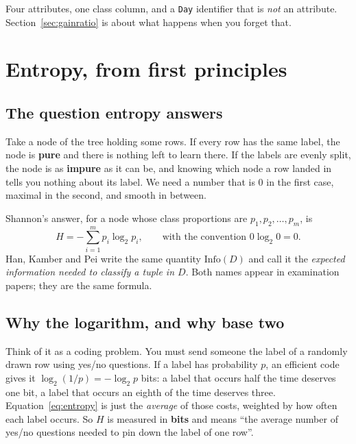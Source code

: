 \documentclass[11pt]{article}
\begin{document}
Four attributes, one class column, and a \texttt{Day} identifier that is
\emph{not} an attribute. Section~\ref{sec:gainratio} is about what happens
when you forget that.

\notesources{\AMLUnitVISources}

\section{Entropy, from first principles}
\label{sec:entropy}

\subsection{The question entropy answers}

Take a node of the tree holding some rows. If every row has the same label,
the node is \textbf{pure} and there is nothing left to learn there. If the
labels are evenly split, the node is as \textbf{impure} as it can be, and
knowing which node a row landed in tells you nothing about its label. We need
a number that is $0$ in the first case, maximal in the second, and smooth in
between.

Shannon's answer, for a node whose class proportions are
$p_1, p_2, \dots, p_m$, is
\begin{equation}
  \label{eq:entropy}
  H = -\sum_{i=1}^{m} p_i \log_2 p_i ,
  \qquad\text{with the convention } 0\log_2 0 = 0 .
\end{equation}
Han, Kamber and Pei write the same quantity $\mathrm{Info}(D)$ and call it the
\emph{expected information needed to classify a tuple in $D$}. Both names
appear in examination papers; they are the same formula.

\subsection{Why the logarithm, and why base two}

Think of it as a coding problem. You must send someone the label of a randomly
drawn row using yes/no questions. If a label has probability $p$, an efficient
code gives it $\log_2 (1/p) = -\log_2 p$ bits: a label that occurs half the
time deserves one bit, a label that occurs an eighth of the time deserves
three. Equation~\eqref{eq:entropy} is just the \emph{average} of those costs,
weighted by how often each label occurs. So $H$ is measured in \textbf{bits}
and means ``the average number of yes/no questions needed to pin down the
label of one row''.
\end{document}

